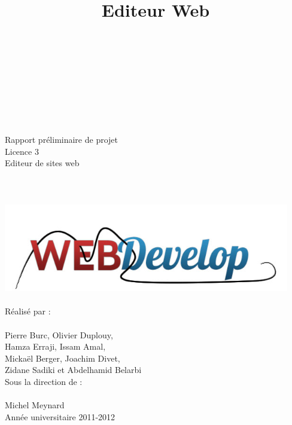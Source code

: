\documentclass[a4paper, 12pt]{report}
\title{Editeur Web}
\begin{document}
	\begin{titlepage}
			\\ 
		~\\
		~\\
		~\\
		~\\
		~\\		
		\begin{center}
			{\large Rapport préliminaire de projet} \\
			{\large Licence 3}\\
			\vspace{1,5cm}
			{\Huge Editeur de sites web}\\
			~\\
			~\\
			~\\
			\includegraphics[width=12.5cm]{images/logoTest1.png}
			~\\
			~\\
			{\large Réalisé par :} \\
			~\\
			{\LARGE Pierre Burc, Olivier Duplouy, \\
				      Hamza Erraji, Issam Amal,\\
				      Mickaël Berger, Joachim Divet,\\
				      Zidane Sadiki et Abdelhamid Belarbi}\\
			\vspace{1,5cm}
			{\large Sous la direction de :} \\
			~\\
			{\LARGE Michel Meynard} \\
			\vspace{2.5cm}
			{\large Année universitaire 2011-2012}			
		\end{center}
	\end{titlepage}
\end{document}

